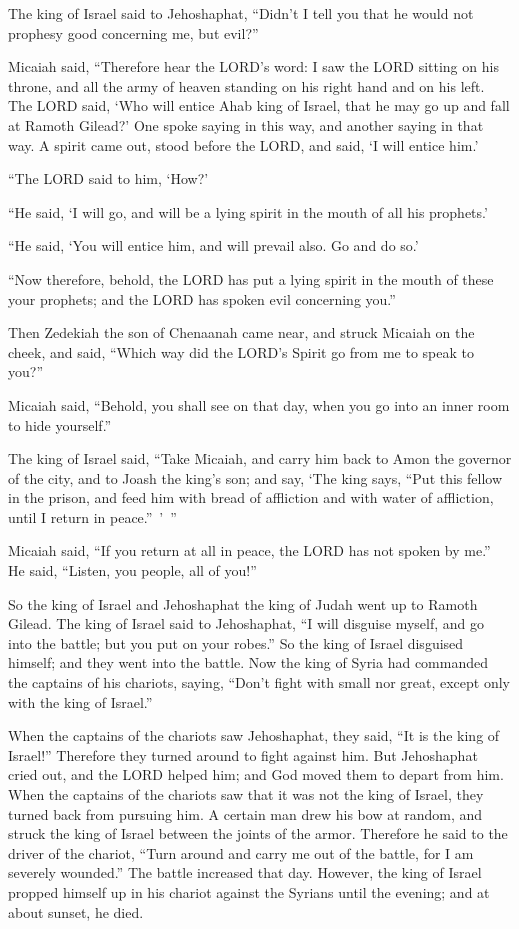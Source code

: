 \myverse{}The king of Israel said to Jehoshaphat, “Didn’t I tell you that
he would not prophesy good concerning me, but evil?”

\myverse{}Micaiah said, “Therefore hear the LORD’s word: I saw the LORD
sitting on his throne, and all the army of heaven standing on his right hand and on his left.
\myverse{}The LORD said, ‘Who will entice Ahab king of Israel, that he may go up and
fall at Ramoth Gilead?’ One spoke saying in this way, and another saying in that way.
\myverse{}A spirit came out, stood before the LORD, and said, ‘I will entice him.’

“The LORD said to him, ‘How?’

\myverse{}“He said, ‘I will go, and will be a lying spirit in the mouth
of all his prophets.’

“He said, ‘You will entice him, and will prevail also. Go and do so.’

\myverse{}“Now therefore, behold, the LORD has put a lying spirit in the
mouth of these your prophets; and the LORD has spoken evil concerning you.”

\myverse{}Then Zedekiah the son of Chenaanah came near, and struck Micaiah
on the cheek, and said, “Which way did the LORD’s Spirit go from me to speak to you?”

\myverse{}Micaiah said, “Behold, you shall see on that day, when you go
into an inner room to hide yourself.”

\myverse{}The king of Israel said, “Take Micaiah, and carry him back to
Amon the governor of the city, and to Joash the king’s son;
\myverse{}and say, ‘The king says, “Put this fellow in the prison, and feed him with
bread of affliction and with water of affliction, until I return in peace.” ’ ”

\myverse{}Micaiah said, “If you return at all in peace, the LORD has not
spoken by me.” He said, “Listen, you people, all of you!”

\myverse{}So the king of Israel and Jehoshaphat the king of Judah went
up to Ramoth Gilead.
\myverse{}The king of Israel said to Jehoshaphat, “I will disguise myself, and go into
the battle; but you put on your robes.” So the king of Israel disguised himself; and they went into the
battle.
\myverse{}Now the king of Syria had commanded the captains of his chariots, saying,
“Don’t fight with small nor great, except only with the king of Israel.”

\myverse{}When the captains of the chariots saw Jehoshaphat, they said,
“It is the king of Israel!” Therefore they turned around to fight against him. But Jehoshaphat cried out,
and the LORD helped him; and God moved them to depart from him.
\myverse{}When the captains of the chariots saw that it was not the king of Israel,
they turned back from pursuing him.
\myverse{}A certain man drew his bow at random, and struck the king of Israel between
the joints of the armor. Therefore he said to the driver of the chariot, “Turn around and carry me out
of the battle, for I am severely wounded.”
\myverse{}The battle increased that day. However, the king of Israel propped himself
up in his chariot against the Syrians until the evening; and at about sunset, he died.


